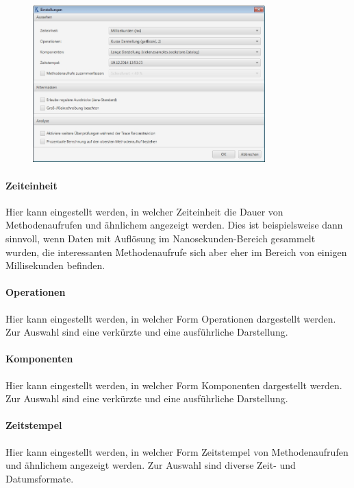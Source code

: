 \documentclass{article}
\begin{document}
  \begin{figure}[h]
    \centering
    \includegraphics[width=0.8\textwidth]{img_DE/Einstellungen.jpg}
  \end{figure}

  \paragraph{Zeiteinheit}
  Hier kann eingestellt werden, in welcher Zeiteinheit die Dauer von Methodenaufrufen und ähnlichem angezeigt werden.
  Dies ist beispielsweise dann sinnvoll, wenn Daten mit Auflösung im Nanosekunden-Bereich gesammelt wurden, die interessanten Methodenaufrufe sich aber eher im Bereich von einigen Millisekunden befinden.

  \paragraph{Operationen}
  Hier kann eingestellt werden, in welcher Form Operationen dargestellt werden.
  Zur Auswahl sind eine verkürzte und eine ausführliche Darstellung.

  \paragraph{Komponenten}
  Hier kann eingestellt werden, in welcher Form Komponenten dargestellt werden.
  Zur Auswahl sind eine verkürzte und eine ausführliche Darstellung.

  \paragraph{Zeitstempel}
  Hier kann eingestellt werden, in welcher Form Zeitstempel von Methodenaufrufen und ähnlichem angezeigt werden.
  Zur Auswahl sind diverse Zeit- und Datumsformate.
\end{document}

